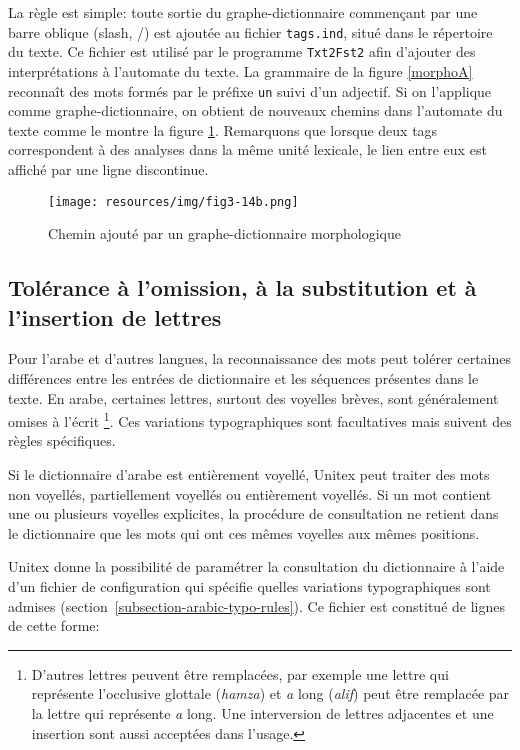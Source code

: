 \noindent La règle est simple: toute sortie du graphe-dictionnaire commençant par une barre oblique (slash, /) 
est ajoutée au fichier \verb+tags.ind+,  situé dans le répertoire du texte.
Ce fichier est utilisé par le programme \verb+Txt2Fst2+ afin d'ajouter des interprétations à
l'automate du texte. La grammaire de la figure \ref{morphoA} reconnaît des mots
formés par le préfixe \verb+un+ suivi d'un adjectif. Si on l'applique comme graphe-dictionnaire,
on obtient de nouveaux chemins dans l'automate du texte comme le montre la figure
\ref{morphoB}. Remarquons que lorsque deux tags correspondent à des analyses dans la même unité lexicale, le lien entre eux est affiché par une ligne discontinue.

\begin{figure}[!ht]
\begin{center}
\texttt{[image: resources/img/fig3-14b.png]}
\caption{Chemin ajouté par un graphe-dictionnaire morphologique\label{morphoB}}
\end{center}
\end{figure}

\subsection{Tolérance à l'omission, à la substitution et à l'insertion de lettres}
\label{section-vowel-restoration}
Pour l'arabe et d'autres langues, la reconnaissance des mots peut tolérer certaines différences entre les entrées de dictionnaire et les séquences présentes dans le texte. En arabe, certaines lettres, surtout des voyelles brèves, sont généralement omises à l'écrit
\footnote{ D'autres lettres peuvent être remplacées, par exemple une lettre qui représente l'occlusive glottale (\textit{hamza}) et \textit{a} long (\textit{alif}) peut être remplacée par la lettre qui représente \textit{a} long. Une interversion de lettres adjacentes et une insertion sont aussi acceptées dans l'usage.}. Ces variations typographiques sont facultatives mais suivent des règles spécifiques.

\bigskip
\noindent Si le dictionnaire d'arabe est entièrement voyellé, Unitex peut traiter des mots non voyellés, partiellement voyellés ou entièrement voyellés. Si un mot contient une ou plusieurs voyelles explicites, la procédure de consultation ne retient dans le dictionnaire que les mots qui ont ces mêmes voyelles aux mêmes positions.

\bigskip
\noindent Unitex donne la possibilité de paramétrer la consultation du dictionnaire à l'aide d'un fichier de configuration qui spécifie quelles variations typographiques sont admises (section~\ref{subsection-arabic-typo-rules}). Ce fichier est constitué de lignes de cette forme:

